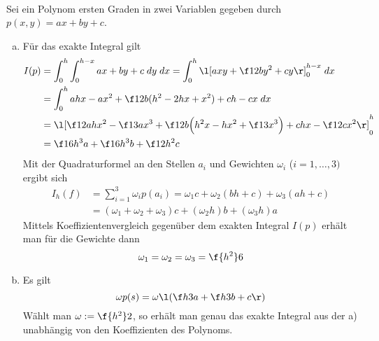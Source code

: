 \documentclass{mywork}
\begin{document}
\begin{aufgabe}~

	Sei ein Polynom ersten Graden in zwei Variablen gegeben durch $p(x,y) = ax + by + c$.
	\begin{enumerate}[a)]
		\item
			Für das exakte Integral gilt
			\begin{align*}
				I(p) 
				&= \int_0^h \int_0^{h-x} ax + by +c \; dy\;dx 
				= \int_0^h \l[axy + \f 12 by^2 + cy\r]_0^{h-x} \;dx \\
				&= \int_0^h ahx -ax^2 + \f 12b ( h^2-2hx + x^2) + ch -cx \;dx \\
				&= \l[\f 12 ahx^2 - \f 13ax^3 + \f 12 b\Big(h^2x-hx^2 + \f 13 x^3\Big) + chx - \f 12 cx^2 \r]_0^h \\
				&= \f 16 h^3 a + \f 16 h^3 b + \f 12 h^2 c
			\end{align*}
			Mit der Quadraturformel an den Stellen $a_i$ und Gewichten $\omega_i$ ($i=1,\dotsc,3)$ ergibt sich
			\begin{align*}
				I_h(f) 
				&= \sum_{i=1}^3 \omega_i p(a_i) 
				= \omega_1 c + \omega_2(bh+c) + \omega_3(ah +c) \\
				&= (\omega_1 + \omega_2 + \omega_3)c + (\omega_2 h)b + (\omega_3 h) a
			\end{align*}
			Mittels Koeffizientenvergleich gegenüber dem exakten Integral $I(p)$ erhält man für die Gewichte dann
			\[
				\omega_1 = \omega_2 = \omega_3 = \f {h^2}6
			\]
		\item
			Es gilt
			\[
				\omega p(s) = \omega\l( \f h3 a + \f h3 b + c \r)
			\]
			Wählt man $\omega := \f {h^2}2$, so erhält man genau das exakte Integral aus der a) unabhängig von den Koeffizienten des Polynoms.
	\end{enumerate}
\end{aufgabe}
\end{document}

